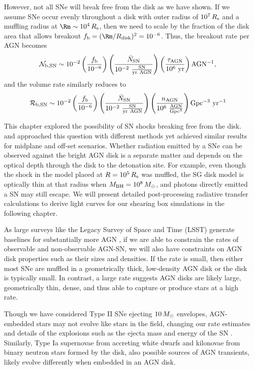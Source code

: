However, not all SNe will break free from the disk as we have shown.
If we assume SNe occur evenly throughout a disk with outer radius of $10^7\,R_{\rm s}$ and a muffling radius at $\Rm\sim10^4\,\Rs$, then we need to scale by the fraction of the disk area that allows breakout $f_{\rm b} = (\Rm / R_{\rm disk})^{2} = 10^{-6}$.
Thus, the breakout rate per AGN becomes
\begin{equation}
    \mathcal{N_{\rm b,SN}} \sim 10^{-2} \left( \frac{f_{\rm b}}{10^{-6}} \right) \left( \frac{\dot{N}_{\rm SN}}{\rm 10^{-2}\ \frac{SN}{yr\ AGN}} \right) \left( \frac{\tau_{\rm AGN}}{\rm 10^6\ yr} \right) \mathrm{AGN^{-1}},
\end{equation}
and the volume rate similarly reduces to
\begin{equation}
    \mathcal{R_{\rm b,SN}} \sim 10^{-2} \left( \frac{f_{\rm b}}{10^{-6}} \right) \left( \frac{\dot{N}_{\rm SN}}{\rm 10^{-2}\ \frac{SN}{yr\ AGN}} \right) \left( \frac{n_{\rm AGN}}{\rm 10^6\ \frac{AGN}{Gpc^3}} \right) \mathrm{Gpc^{-3}\ yr^{-1}}
\end{equation}

This chapter explored the possibility of SN shocks breaking free from the disk.
\citet{Moranchel+21} and \citet{Grishin+21} approached this question with different methods yet achieved similar results for midplane and off-set scenarios.
Whether radiation emitted by a SNe can be observed against the bright AGN disk is a separate matter and depends on the optical depth through the disk to the detonation site.
For example, even though the shock in the model placed at $R=10^5\,R_{\rm s}$ was muffled, the SG disk model is optically thin at that radius when $M_{\rm BH}=10^8\,M_{\odot}$, and photons directly emitted a SN may still escape.
We will present detailed post-processing radiative transfer calculations to derive light curves for our shearing box simulations in the following chapter.

As large surveys like the Legacy Survey of Space and Time (LSST) generate baselines for substantially more AGN \citep{Kovacevic+22}, if we are able to constrain the rates of observable and non-observable AGN-SN, we will also have constraints on AGN disk properties such as their sizes and densities.
If the rate is small, then either most SNe are muffled in a geometrically thick, low-density AGN disk or the disk is typically small.
In contrast, a large rate suggests AGN disks are likely large, geometrically thin, dense, and thus able to capture or produce stars at a high rate.

Though we have considered Type II SNe ejecting $10\,M_{\odot}$ envelopes, AGN-embedded stars may not evolve like stars in the field, changing our rate estimates and details of the explosions such as the ejecta mass and energy of the SN \citep{CantielloJermynLin21, DittmannJermynCantiello23}.
Similarly, Type Ia supernovae from accreting white dwarfs and kilonovae from binary neutron stars formed by the disk, also possible sources of AGN transients, likely evolve differently when embedded in an AGN disk.

